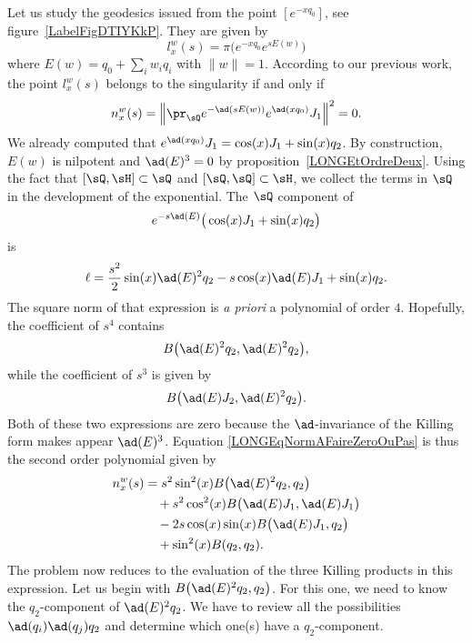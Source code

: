Let us study the geodesics issued from the point $[ e^{-xq_0}]$, see figure~\ref{LabelFigDTIYKkP}. They are given by
\begin{equation}
	l^w_x(s)=\pi\big(    e^{-xq_0} e^{sE(w)} \big)
\end{equation}
where $E(w)=q_0+\sum_iw_iq_i$ with $\| w \|=1$. According to our previous work, the point $l^w_x(s)$ belongs to the singularity if and only if
\begin{equation}        \label{LONGEqNormAFaireZeroOuPas}
	n_x^w(s)=\left\|   \pr_{\sQ} e^{-\ad(sE(w))} e^{\ad(xq_0)}J_1  \right\|^2=0.
\end{equation}
%
We already computed that $ e^{\ad(xq_0)}J_1=\cos(x)J_1+\sin(x)q_2$. By construction, $E(w)$ is nilpotent and $\ad(E)^3=0$ by proposition~\ref{LONGEtOrdreDeux}. Using the fact that $[\sQ,\sH]\subset\sQ$ and $[\sQ,\sQ]\subset\sH$, we collect the terms in $\sQ$ in the development of the exponential. The $\sQ$ component of
\begin{equation}
	e^{-s\ad(E)}\big( \cos(x)J_1+\sin(x)q_2 \big)
\end{equation}
is
\begin{equation}
	\ell=\frac{ s^2 }{ 2 }\sin(x)\ad(E)^2q_2-s\cos(x)\ad(E)J_1+\sin(x)q_2.
\end{equation}
The square norm of that expression is \emph{a priori} a polynomial of order $4$. Hopefully, the coefficient of $s^4$ contains
\begin{equation}
	B\big( \ad(E)^2q_2,\ad(E)^2q_2 \big),
\end{equation}
while the coefficient of $s^3$ is given by
\begin{equation}
	B\big( \ad(E)J_2,\ad(E)^2q_2 \big).
\end{equation}
Both of these two expressions are zero because the $\ad$-invariance of the Killing form makes appear $\ad(E)^3$. Equation \eqref{LONGEqNormAFaireZeroOuPas} is thus the second order polynomial given by
%
%
\begin{equation}        \label{LONGEqnwxBBB}
	\begin{aligned}[]
		n_x^w(s) & =s^2\sin^2(x)B\big( \ad(E)^2q_2,q_2 \big)          \\
		         & \quad+s^2\cos^2(x)B\big( \ad(E)J_1,\ad(E) J_1\big) \\
		         & \quad-2s\cos(x)\sin(x)B\big( \ad(E)J_1,q_2 \big)   \\
		         & \quad+\sin^2(x)B(q_2,q_2).
	\end{aligned}
\end{equation}
The problem now reduces to the evaluation of the three Killing products in this expression. %
%
Let us begin with $B\big( \ad(E)^2q_2,q_2 \big)$. For this one, we need to know the $q_2$-component of $\ad(E)^2q_2$. We have to review all the possibilities $\ad(q_i)\ad(q_j)q_2$ and determine which one(s) have a $q_2$-component.

